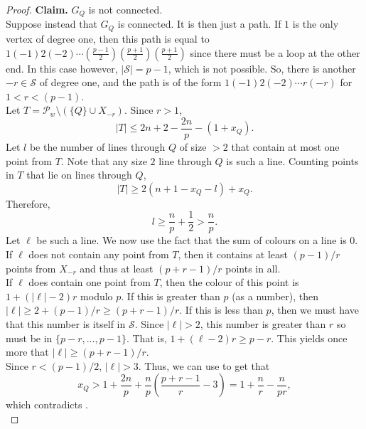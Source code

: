 \begin{proof}
		\textbf{Claim.} $G_Q$ is not connected.\\
		Suppose instead that $G_Q$ is connected.
		It is then just a path. If $1$ is the only vertex of degree one, then this path is equal to $1(-1)2(-2)\cdots (\frac{p-1}{2})(\frac{p+1}{2})(\frac{p+1}{2})$ since there must be a loop at the other end. In this case however, $|\mathcal{S}| = p-1$, which is not possible. So, there is another $-r \in \mathcal{S}$ of degree one, and the path is of the form $1 (-1) 2 (-2) \cdots r (-r)$ for $1 < r < (p-1)$.\\
		Let $T = \mathcal{P}_w \setminus (\{Q\} \cup X_{-r})$. Since $r > 1$,
		\[ |T| \le 2n + 2 - \frac{2n}{p} - (1 + x_Q). \]
		Let $l$ be the number of lines through $Q$ of size $>2$ that contain at most one point from $T$. Note that any size $2$ line through $Q$ is such a line. Counting points in $T$ that lie on lines through $Q$,
		\[ |T| \ge 2 (n+1 - x_Q - l) + x_Q. \]
		Therefore,
		\[ l \ge \frac{n}{p} + \frac{1}{2} > \frac{n}{p}. \]
		Let $\ell$ be such a line. We now use the fact that the sum of colours on a line is $0$. \\
		If $\ell$ does not contain any point from $T$, then it contains at least $(p-1)/r$ points from $X_{-r}$ and thus at least $(p+r-1)/r$ points in all.\\
		If $\ell$ does contain one point from $T$, then the colour of this point is $1 + (|\ell|-2)r$ modulo $p$. If this is greater than $p$ (as a number), then $|\ell| \ge 2 + (p-1)/r \ge (p+r-1)/r$. If this is less than $p$, then we must have that this number is itself in $\mathcal{S}$. Since $|\ell| > 2$, this number is greater than $r$ so must be in $\{p-r,\ldots,p-1\}$. That is, $1 + (\ell-2)r \ge p-r$. This yields once more that $|\ell| \ge (p+r-1)/r$.\\
		Since $r < (p-1)/2$, $|\ell| > 3$. Thus, we can use  to get that
		\[ x_Q > 1 + \frac{2n}{p} + \frac{n}{p} \left( \frac{p+r-1}{r} - 3 \right) = 1 + \frac{n}{r} - \frac{n}{pr}, \]
		which contradicts . \qedwhite \\


\end{proof}
